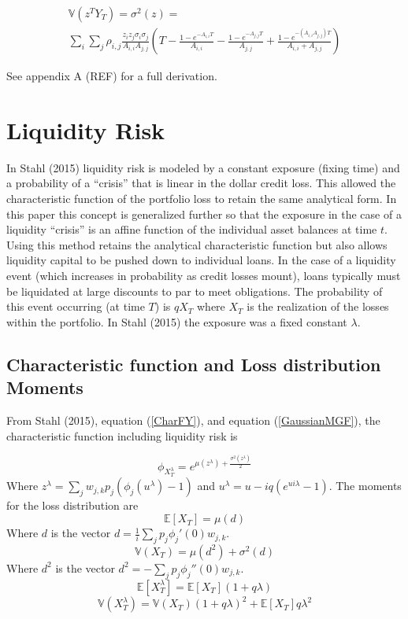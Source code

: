 \documentclass[12pt]{article}
\theoremstyle{definition}
\begin{document}
\begin{multline}\label{varianceY} \mathbb{V}(z^T Y_T)=\sigma^2(z)=\\ \sum_i \sum_j \rho_{i,j} \frac{ z_i z_j \sigma_i \sigma_j}{A_{i,i} A_{j,j}} \left(T-\frac{1-e^{-A_{i,i}T}}{A_{i,i}}-\frac{1-e^{-A_{j,j}T}}{A_{j,j}}+\frac{1-e^{-(A_{i,i}A_{j,j})T}}{A_{i,i}+A_{j,j}}\right) \end{multline}

See appendix A (REF) for a full derivation.

\section{Liquidity Risk} \label{riskContributions}
In Stahl (2015) liquidity risk is modeled by a constant exposure (fixing time) and a probability of a ``crisis'' that is linear in the dollar credit loss.  This allowed the characteristic function of the portfolio loss to retain the same analytical form.  In this paper this concept is generalized further so that the exposure in the case of a liquidity ``crisis'' is an affine function of the individual asset balances at time \(t\).  Using this method retains the analytical characteristic function but also allows liquidity capital to be pushed down to individual loans.  In the case of a liquidity event (which increases in probability as credit losses mount), loans typically must be liquidated at large discounts to par to meet obligations.  The probability of this event occurring (at time \(T\)) is \(q X_T\) where \(X_T\) is the realization of the losses within the portfolio.  In Stahl (2015) the exposure was a fixed constant \(\lambda\).  

\subsection{Characteristic function and Loss distribution Moments}
From Stahl (2015), equation (\ref{CharFY}), and equation (\ref{GaussianMGF}), the characteristic function including liquidity risk is

\begin{equation} \label{finalCH}
\phi_{X_T ^ \lambda}=e^{\mu(z^\lambda)+\frac{\sigma^2(z^\lambda)}{2} }
\end{equation}
Where \(z^\lambda=\sum_j w_{j, k}  p_j (\phi_j(u^\lambda )-1)\) and \(u^\lambda=u-iq\left(e^{ui\lambda}-1\right)\).  The moments for the loss distribution are
\begin{equation} \mathbb{E}[X_T]=\mu(d) \end{equation}
Where \(d\) is the vector  \(d=\frac{1}{i}\sum_j p_j \phi_j'(0) w_{j, k}\).
\begin{equation}\mathbb{V}(X_T)=\mu(d ^2)+\sigma^2(d) \end{equation}
Where \(d ^2\) is the vector \(d^2=-\sum_j p_j\phi_j''(0) w_{j, k}\).
\begin{equation} \mathbb{E}[X_T ^ \lambda]=\mathbb{E}[X_T](1+q\lambda) \end{equation}
\begin{equation} \mathbb{V}(X_T ^ \lambda)=\mathbb{V}(X_T)(1+q\lambda)^2+\mathbb{E}[X_T]q\lambda^2\end{equation}
\end{document}

